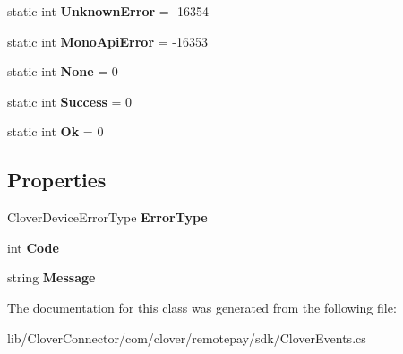 \begin{DoxyCompactItemize}
static int {\bfseries Unknown\+Error} = -\/16354
\item 
\mbox{\label{classcom_1_1clover_1_1remotepay_1_1sdk_1_1_clover_device_error_event_afb0d36a18875cc902095dfc08ef64104}} 
static int {\bfseries Mono\+Api\+Error} = -\/16353
\item 
\mbox{\label{classcom_1_1clover_1_1remotepay_1_1sdk_1_1_clover_device_error_event_a760e41e19795eaa2ceceeba5f4e17304}} 
static int {\bfseries None} = 0
\item 
\mbox{\label{classcom_1_1clover_1_1remotepay_1_1sdk_1_1_clover_device_error_event_a51c818fac0fa0543f894a8b297042788}} 
static int {\bfseries Success} = 0
\item 
\mbox{\label{classcom_1_1clover_1_1remotepay_1_1sdk_1_1_clover_device_error_event_a19df9ae52779862230842bc6f74cbc0e}} 
static int {\bfseries Ok} = 0
\end{DoxyCompactItemize}
\subsection*{Properties}
\begin{DoxyCompactItemize}
\item 
\mbox{\label{classcom_1_1clover_1_1remotepay_1_1sdk_1_1_clover_device_error_event_ade077516a0c3a3f2dd000f7bec01f3fb}} 
Clover\+Device\+Error\+Type {\bfseries Error\+Type}
\item 
\mbox{\label{classcom_1_1clover_1_1remotepay_1_1sdk_1_1_clover_device_error_event_a8e63171bf0f7241f8f1165295b9f0dc9}} 
int {\bfseries Code}
\item 
\mbox{\label{classcom_1_1clover_1_1remotepay_1_1sdk_1_1_clover_device_error_event_ae116a3f38e23253e8fc1d49299c1cae6}} 
string {\bfseries Message}
\end{DoxyCompactItemize}


The documentation for this class was generated from the following file\+:\begin{DoxyCompactItemize}
\item 
lib/\+Clover\+Connector/com/clover/remotepay/sdk/Clover\+Events.\+cs\end{DoxyCompactItemize}
